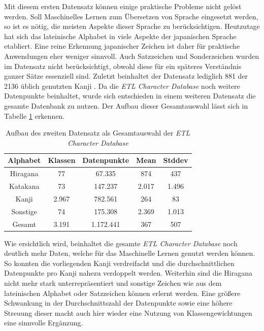 \documentclass[twoside,a4paper]{IEEEtran}
\begin{document}
Mit diesem ersten Datensatz können einige praktische Probleme nicht gelöst werden. Soll Maschinelles Lernen zum Übersetzen von Sprache eingesetzt werden, so ist es nötig, die meisten Aspekte dieser Sprache zu berücksichtigen. Heutzutage hat sich das lateinische Alphabet in viele Aspekte der japanischen Sprache etabliert. Eine reine Erkennung japanischer Zeichen ist daher für praktische Anwendungen eher weniger sinnvoll. Auch Satzzeichen und Sonderzeichen wurden im Datensatz nicht berücksichtigt, obwohl diese für ein späteres Verständnis ganzer Sätze essenziell sind. Zuletzt beinhaltet der Datensatz lediglich 881 der 2136 üblich genutzten Kanji \cite[S.3]{RHC}. Da die \emph{ETL Character Database} noch weitere Datenpunkte beinhaltet, wurde sich entschieden in einem weiteren Datensatz die gesamte Datenbank zu nutzen. Der Aufbau dieser Gesamtauswahl lässt sich in Tabelle \ref{data_total} erkennen.

\begin{table}[!htb]
	\caption{Aufbau des zweiten Datensatz als Gesamtauswahl der \emph{ETL Character Database}}
	\label{data_total}
	\centering
	\begin{tabular}{|c|c|c|c|c|}
		\hline
		Alphabet & Klassen & Datenpunkte & Mean & Stddev\\
		\hline
		\hline
		Hiragana & 77 & 67.335 & 874 & 437\\
		\hline 
		Katakana & 73 & 147.237 & 2.017 & 1.496\\
		\hline
		Kanji & 2.967 & 782.561 & 264 & 83\\
		\hline
		Sonstige & 74 & 175.308 & 2.369 & 1.013\\
		\hline
		\hline
		Gesamt & 3.191 & 1.172.441 & 367 & 507\\
		\hline
	\end{tabular}
\end{table}
Wie ersichtlich wird, beinhaltet die gesamte \emph{ETL Character Database} noch deutlich mehr Daten, welche für das Maschinelle Lernen genutzt werden können. So konnten die vorliegenden Kanji verdreifacht und die durchschnittlichen Datenpunkte pro Kanji nahezu verdoppelt werden. Weiterhin sind die Hiragana nicht mehr stark unterrepräsentiert und sonstige Zeichen wie aus dem lateinischen Alphabet oder Satzzeichen können erlernt werden. Eine größere Schwankung in der Durchschnittszahl der Datenpunkte sowie eine höhere Streuung dieser macht auch hier wieder eine Nutzung von Klassengewichtungen eine sinnvolle Ergänzung.
\end{document}
